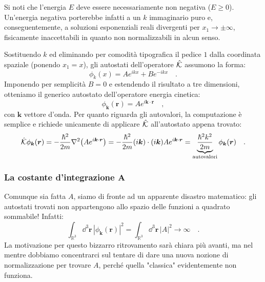 Si noti che l'energia $E$ deve essere necessariamente non negativa ($E \ge 0$). Un'energia negativa porterebbe infatti a un $k$ immaginario puro e, conseguentemente, a soluzioni esponenziali reali divergenti per $x_1 \to \pm\infty$, fisicamente inaccettabili in quanto non normalizzabili in alcun senso.

Sostituendo $k$ ed eliminando per comodità tipografica il pedice $1$ dalla coordinata spaziale (ponendo $x_1 = x$), gli autostati dell'operatore $\hat{\mathcal{K}}$ assumono la forma:
\[
    \phi_k(x) = A e^{ikx} + B e^{-ikx} \quad.
\]
Imponendo per semplicità $B = 0$ e estendendo il risultato a tre dimensioni, otteniamo il generico autostato dell'operatore energia cinetica:
\[
    \phi_{\bm{k}}(\bm{r}) = Ae^{i\bm{k}\cdot \bm{r}}\quad,
\]
con $\bm{k}$ vettore d'onda. Per quanto riguarda gli autovalori, la computazione è semplice e richiede unicamente di applicare $\hat{\mathcal{K}}$ all'autostato appena trovato:
\[
    \hat{\mathcal{K}} \phi_{\bm{k}}(\bm{r}) = -\frac{\hbar^2}{2m}\nabla^2 \big(Ae^{i\bm{k}\cdot \bm{r}}\big) = -\frac{\hbar^2}{2m}  (i\bm{k})\cdot(i\bm{k})Ae^{i\bm{k}\cdot \bm{r}} = \underbrace{\frac{\hbar^2k^2}{2m}}_{\text{autovalori}}\phi_{\bm{k}}(\bm{r}) \quad.
\]

\subsubsection{La costante d'integrazione $\bm{A}$}
Comunque sia fatta $A$, siamo di fronte ad un apparente disastro matematico: gli autostati trovati non appartengono allo spazio delle funzioni a quadrato sommabile! Infatti:
\[
    \int_{\mathbb{R}^3} \dd^3{\bm{r}}\, |\phi_{\bm{k}}(\bm{r})|^2 =  \int_{\mathbb{R}^3} \dd^3{\bm{r}}\, |A|^2 \to \infty \quad.
\] 
La motivazione per questo bizzarro ritrovamento sarà chiara più avanti, ma nel mentre dobbiamo concentrarci sul tentare di dare una nuova nozione di normalizzazione per trovare $A$, perché quella "classica" evidentemente non funziona. 

